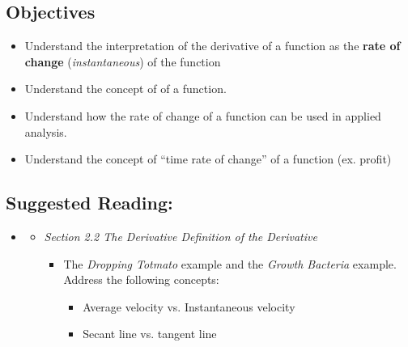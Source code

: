 \vspace{-0.25 in}
\begin{framed}
\subsection*{Objectives}
\begin{itemize}
    \item Understand the interpretation of the derivative of a function as the \textbf{rate of change} (\emph{instantaneous}) of the function
    \item Understand the concept of  of a function.
    \item Understand how the rate of change of a function can be used in applied analysis.
    \item Understand the concept of “time rate of change” of a function (ex. profit)
\end{itemize}

\subsection*{Suggested Reading:}
\begin{itemize}
\item \cite{Calaway}\footnotemark[1]
   \begin{itemize}
        \item \emph{Section 2.2 The Derivative Definition of the Derivative}
        \begin{itemize}
            \item The \emph{Dropping Totmato} example and the \emph{Growth Bacteria} example. Address the following concepts:
            \begin{itemize}
                \item Average velocity vs. Instantaneous velocity
            \item Secant line vs. tangent line
            \end{itemize}
        \end{itemize}
    \end{itemize}

\end{itemize}

\end{framed}
